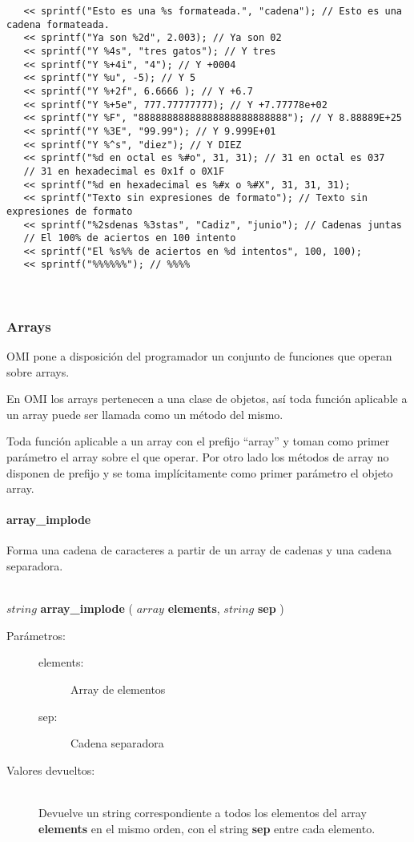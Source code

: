 \begin{lstlisting}   
   << sprintf("Esto es una %s formateada.", "cadena"); // Esto es una cadena formateada.
   << sprintf("Ya son %2d", 2.003); // Ya son 02
   << sprintf("Y %4s", "tres gatos"); // Y tres
   << sprintf("Y %+4i", "4"); // Y +0004
   << sprintf("Y %u", -5); // Y 5
   << sprintf("Y %+2f", 6.6666 ); // Y +6.7
   << sprintf("Y %+5e", 777.77777777); // Y +7.77778e+02
   << sprintf("Y %F", "88888888888888888888888888"); // Y 8.88889E+25
   << sprintf("Y %3E", "99.99"); // Y 9.999E+01
   << sprintf("Y %^s", "diez"); // Y DIEZ
   << sprintf("%d en octal es %#o", 31, 31); // 31 en octal es 037
   // 31 en hexadecimal es 0x1f o 0X1F
   << sprintf("%d en hexadecimal es %#x o %#X", 31, 31, 31); 
   << sprintf("Texto sin expresiones de formato"); // Texto sin expresiones de formato
   << sprintf("%2sdenas %3stas", "Cadiz", "junio"); // Cadenas juntas
   // El 100% de aciertos en 100 intento
   << sprintf("El %s%% de aciertos en %d intentos", 100, 100); 
   << sprintf("%%%%%%"); // %%%%
\end{lstlisting}
\hfill\\ 

\subsubsection{Arrays}
OMI pone a disposición del programador un conjunto de funciones que operan sobre arrays.

En OMI los arrays pertenecen a una clase de objetos, así toda función aplicable a un array
puede ser llamada como un método del mismo. 

Toda función aplicable a un array con el prefijo ``array'' y toman como primer parámetro el array sobre el que 
operar. Por otro lado los métodos de array no disponen de prefijo y se toma implícitamente como primer parámetro el objeto 
array.

\paragraph{array\_implode}
Forma una cadena de caracteres a partir de un array de cadenas y una cadena separadora. 

\hfill \\ $string$ \textbf{array\_implode} ( $array$ \textbf{elements}, $string$ \textbf{sep} )  
\begin{description}
\item [Parámetros:] \hfill 
   \begin{description}
   \item[elements:] Array de elementos
   \item[sep:] Cadena separadora
   \end{description}
\item[Valores devueltos:] \hfill \\
   Devuelve un string correspondiente a todos los elementos del array \textbf{elements} en el mismo orden, con el string \textbf{sep} entre cada elemento. 
\end{description}
     
